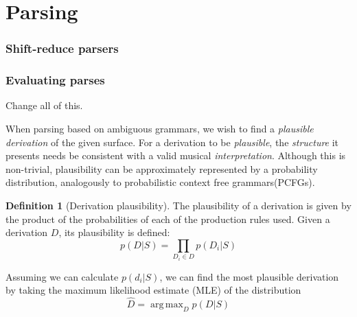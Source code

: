 \documentclass[12pt,a4paper,twoside,openright]{report}
\DeclareMathOperator*{\argmax}{arg\,max}
\theoremstyle{definition}
\newtheorem{definition}{Definition}[section]
\begin{document}
\section{Parsing} %
\label{sub:protovoiceParsing}

\subsubsection{Shift-reduce parsers}

\subsubsection{Evaluating parses}

Change all of this.

When parsing based on ambiguous grammars, we wish to find a \textit{plausible derivation} of the given surface. For a derivation to be \textit{plausible}, the \textit{structure} it presents needs be consistent with a valid musical \textit{interpretation}. Although this is non-trivial, plausibility can be approximately represented by a probability distribution, analogously to probabilistic context free grammars(PCFGs).
\par
\par
\begin{definition}[Derivation plausibility]
  The plausibility of a derivation is given by the product of the probabilities of each of the production rules used. Given a derivation $D$, its plausibility is defined:
  \begin{equation}
    p(D|S) = \prod_{D_i \in D}  p(D_i|S)
  \end{equation}
\end{definition}


Assuming we can calculate $p(d_i|S)$, we can find the most plausible derivation by taking the maximum likelihood estimate (MLE) of the distribution
\begin{equation}
  \hat D = \argmax_{D}  p(D|S)
  \label{eq:mapApproach}
\end{equation}
\end{document}
